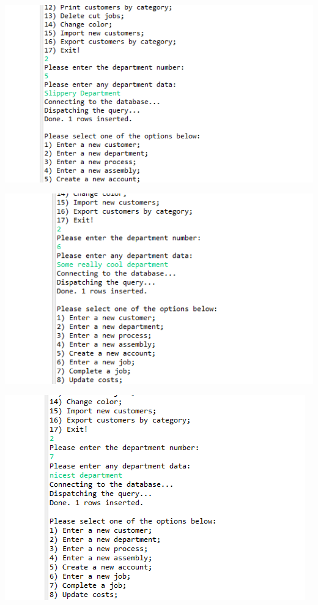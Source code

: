 \documentclass[11pt]{article}
\begin{document}
\includegraphics[width = \textwidth]{insertDept3.png}

\includegraphics[width = \textwidth]{insertDept4.png}

\includegraphics[width = \textwidth]{insertDept5.png}
\end{document}
